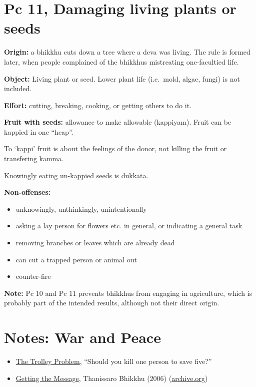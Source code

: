 \section{Pc 11, Damaging living plants or seeds}

\begin{multicols}{2}

\textbf{Origin:} a bhikkhu cuts down a tree where a deva was living. The
rule is formed later, when people complained of the bhikkhus mistreating
one-facultied life.

\textbf{Object:} Living plant or seed. Lower plant life (i.e.~mold,
algae, fungi) is not included.

\textbf{Effort:} cutting, breaking, cooking, or getting others to do it.

\textbf{Fruit with seeds:} allowance to make allowable (kappiyam). Fruit
can be kappied in one ``heap''.

\columnbreak

To `kappi' fruit is about the feelings of the donor, not killing the
fruit or transfering kamma.

Knowingly eating un-kappied seeds is dukkata.

\textbf{Non-offenses:}

\begin{itemize}
\tightlist
\item
  unknowingly, unthinkingly, unintentionally
\item
  asking a lay person for flowers etc. in general, or indicating a
  general task
\item
  removing branches or leaves which are already dead
\item
  can cut a trapped person or animal out
\item
  counter-fire
\end{itemize}

\end{multicols}
\par
\enlargethispage{2\baselineskip}

\textbf{Note:} Pc 10 and Pc 11 prevents bhikkhus from engaging in
agriculture, which is probably part of the intended results, although
not their direct origin.

\section{Notes: War and Peace}

\begin{itemize}
\item
  \href{https://en.wikipedia.org/wiki/Trolley_problem}{The Trolley
  Problem}, ``Should you kill one person to save five?''
\item
  \href{https://www.buddhistinquiry.org/article/getting-the-message/}{Getting
  the Message}, Thanissaro Bhikkhu (2006)
  (\href{https://web.archive.org/web/20201113023105/https://www.buddhistinquiry.org/article/getting-the-message/}{archive.org})
\end{itemize}

